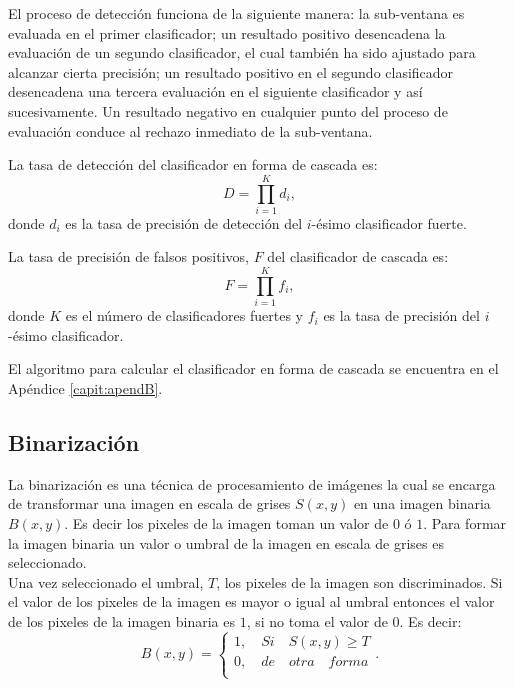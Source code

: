 El proceso de detección funciona de la siguiente manera: la sub-ventana es evaluada en el primer clasificador; un resultado positivo desencadena la evaluación de un segundo clasificador, el cual también ha sido ajustado para alcanzar cierta precisión; un resultado positivo en el segundo clasificador desencadena una tercera evaluación en el siguiente clasificador y así sucesivamente. Un resultado negativo en cualquier punto del proceso de evaluación conduce al rechazo inmediato de la sub-ventana.

La tasa de detección del clasificador en forma de cascada es: 
\begin{equation} \label{eq:D}
D = \prod^K_{i=1} d_i ,
\end{equation}
donde $d_i$ es la tasa de precisión de detección del $i$-ésimo clasificador fuerte.  

La tasa de precisión de falsos positivos, $F$ del clasificador de cascada es: 
\begin{equation} \label{eq:F}
F = \prod^K_{i=1} f_i ,
\end{equation}
donde $K$ es el número de clasificadores fuertes y $f_i$ es la tasa de precisión del $i$-ésimo clasificador. 
 
El algoritmo para calcular el clasificador en forma de cascada se encuentra en el Apéndice \ref{capit:apendB}. 

\subsection{Binarización}\label{subsec:Binarization} 

La binarización es una técnica de procesamiento de imágenes la cual se encarga de transformar una imagen en escala de grises $S(x,y)$ en una imagen binaria $B(x,y)$. Es decir los pixeles de la imagen toman un valor de $0$ ó $1$. Para formar la imagen binaria un valor o umbral de la imagen en escala de grises es seleccionado. \\ 
Una vez seleccionado el umbral, $T$, los pixeles de la imagen son discriminados. Si el valor de los pixeles de la imagen es mayor o igual al umbral entonces el valor de los pixeles de la imagen binaria es $1$, si no toma el valor de $0$. Es decir: 
\begin{equation}
B(x,y)=
\begin{cases}   
1, \quad Si \quad S(x,y)\geq T \\
0, \quad de \quad otra \quad forma\\
\end{cases}.
\end{equation}

